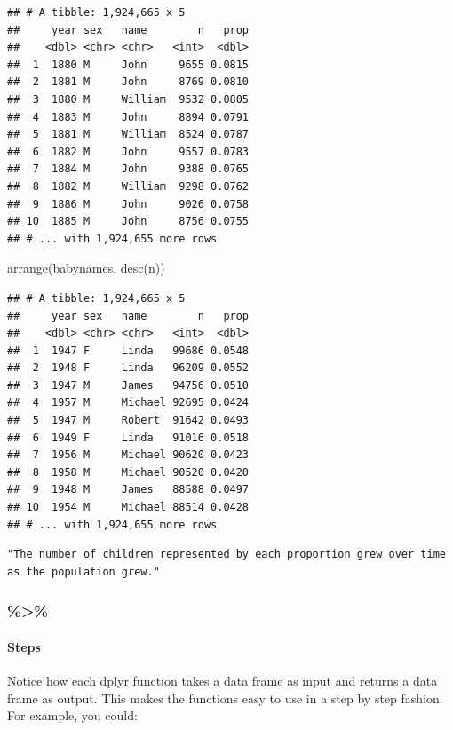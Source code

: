 \documentclass[
]{article}
\newenvironment{Shaded}{\begin{snugshade}}{\end{snugshade}}
\newcommand{\FunctionTok}[1]{\textcolor[rgb]{0.00,0.00,0.00}{#1}}
\newcommand{\NormalTok}[1]{#1}
\begin{document}
\begin{verbatim}
## # A tibble: 1,924,665 x 5
##     year sex   name        n   prop
##    <dbl> <chr> <chr>   <int>  <dbl>
##  1  1880 M     John     9655 0.0815
##  2  1881 M     John     8769 0.0810
##  3  1880 M     William  9532 0.0805
##  4  1883 M     John     8894 0.0791
##  5  1881 M     William  8524 0.0787
##  6  1882 M     John     9557 0.0783
##  7  1884 M     John     9388 0.0765
##  8  1882 M     William  9298 0.0762
##  9  1886 M     John     9026 0.0758
## 10  1885 M     John     8756 0.0755
## # ... with 1,924,655 more rows
\end{verbatim}

\begin{Shaded}
\begin{Highlighting}[]
\FunctionTok{arrange}\NormalTok{(babynames, }\FunctionTok{desc}\NormalTok{(n))}
\end{Highlighting}
\end{Shaded}

\begin{verbatim}
## # A tibble: 1,924,665 x 5
##     year sex   name        n   prop
##    <dbl> <chr> <chr>   <int>  <dbl>
##  1  1947 F     Linda   99686 0.0548
##  2  1948 F     Linda   96209 0.0552
##  3  1947 M     James   94756 0.0510
##  4  1957 M     Michael 92695 0.0424
##  5  1947 M     Robert  91642 0.0493
##  6  1949 F     Linda   91016 0.0518
##  7  1956 M     Michael 90620 0.0423
##  8  1958 M     Michael 90520 0.0420
##  9  1948 M     James   88588 0.0497
## 10  1954 M     Michael 88514 0.0428
## # ... with 1,924,655 more rows
\end{verbatim}

\begin{verbatim}
"The number of children represented by each proportion grew over time as the population grew."
\end{verbatim}

\hypertarget{section}{%
\subsubsection{\%\textgreater\%}\label{section}}

\hypertarget{steps}{%
\paragraph{Steps}\label{steps}}

Notice how each dplyr function takes a data frame as input and returns a
data frame as output. This makes the functions easy to use in a step by
step fashion. For example, you could:
\end{document}
